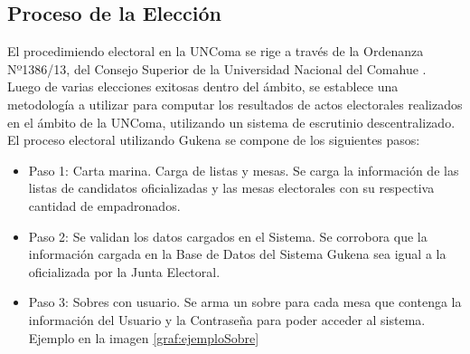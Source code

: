 \subsection{Proceso de la Elección}

El procedimiendo electoral en la UNComa se rige a través de la Ordenanza Nº1386/13, del Consejo Superior de la Universidad Nacional del Comahue \cite{ordenanzaUncoma}. Luego de varias elecciones exitosas dentro del ámbito, se establece una metodología a utilizar para computar los resultados de actos electorales realizados en el ámbito de la UNComa, utilizando un sistema de escrutinio descentralizado. \newline
El proceso electoral utilizando Gukena se compone de los siguientes pasos:
\begin{itemize}

\item Paso 1: Carta marina. Carga de listas y mesas. Se carga la información de las listas de candidatos oficializadas y las mesas electorales con su respectiva cantidad de empadronados.
\item Paso 2: Se validan los datos cargados en el Sistema. Se corrobora que la información cargada en la Base de Datos del Sistema Gukena sea igual a la oficializada por la Junta Electoral.
\item Paso 3: Sobres con usuario. Se arma un sobre para cada mesa que contenga la información del Usuario y la Contraseña para poder acceder al sistema. Ejemplo en la imagen \ref{graf:ejemploSobre}


\end{itemize}
